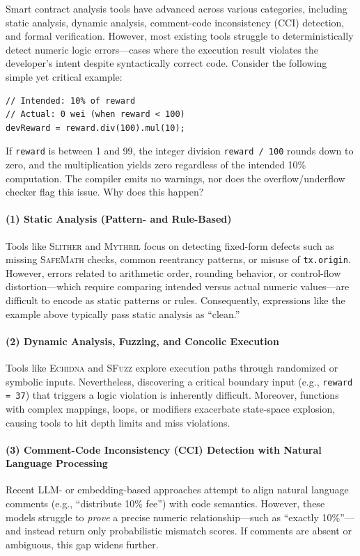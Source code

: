 \documentclass[pdflatex,sn-basic]{sn-jnl}%
\theoremstyle{thmstyleone}%
\theoremstyle{thmstyletwo}%
\theoremstyle{thmstylethree}%
\begin{document}
Smart contract analysis tools have advanced across various categories, including static analysis, dynamic analysis, comment-code inconsistency (CCI) detection, and formal verification. However, most existing tools struggle to deterministically detect numeric logic errors—cases where the execution result violates the developer’s intent despite syntactically correct code. Consider the following simple yet critical example:

\begin{lstlisting}[language=Solidity]
// Intended: 10% of reward
// Actual: 0 wei (when reward < 100)
devReward = reward.div(100).mul(10);
\end{lstlisting}

If \texttt{reward} is between 1 and 99, the integer division \texttt{reward / 100} rounds down to zero, and the multiplication yields zero regardless of the intended 10\% computation. The compiler emits no warnings, nor does the overflow/underflow checker flag this issue. Why does this happen?

\paragraph{(1) Static Analysis (Pattern- and Rule-Based)}
Tools like \textsc{Slither} and \textsc{Mythril} focus on detecting fixed-form defects such as missing \textsc{SafeMath} checks, common reentrancy patterns, or misuse of \texttt{tx.origin}. However, errors related to arithmetic order, rounding behavior, or control-flow distortion—which require comparing intended versus actual numeric values—are difficult to encode as static patterns or rules. Consequently, expressions like the example above typically pass static analysis as “clean.”

\paragraph{(2) Dynamic Analysis, Fuzzing, and Concolic Execution}
Tools like \textsc{Echidna} and \textsc{SFuzz} explore execution paths through randomized or symbolic inputs. Nevertheless, discovering a critical boundary input (e.g., \texttt{reward = 37}) that triggers a logic violation is inherently difficult. Moreover, functions with complex mappings, loops, or modifiers exacerbate state-space explosion, causing tools to hit depth limits and miss violations.

\paragraph{(3) Comment-Code Inconsistency (CCI) Detection with Natural Language Processing}
Recent LLM- or embedding-based approaches attempt to align natural language comments (e.g., “distribute 10\% fee”) with code semantics. However, these models struggle to \textit{prove} a precise numeric relationship—such as “exactly 10\%”—and instead return only probabilistic mismatch scores. If comments are absent or ambiguous, this gap widens further.
\end{document}
